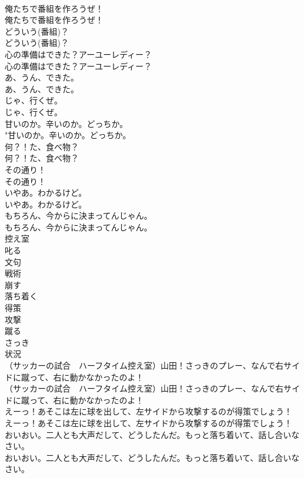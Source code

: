 \documentclass[8pt]{extreport}
\begin{document}
\begin{CJK}{UTF8}{min}
\\	俺たちで番組を作ろうぜ！	
\\	俺たちで番組を作ろうぜ！ 
\\	どういう(番組)？	
\\	どういう(番組)？ 
\\	心の準備はできた？アーユーレディー？	
\\	心の準備はできた？アーユーレディー？ 
\\	あ、うん、できた。	
\\	あ、うん、できた。 
\\	じゃ、行くぜ。	
\\	じゃ、行くぜ。 
\\	甘いのか。辛いのか。どっちか。	
\\	"甘いのか。辛いのか。どっちか。 
\\	何？！た、食べ物？	
\\	何？！た、食べ物？ 
\\	その通り！	
\\	その通り！ 
\\	いやあ。わかるけど。	
\\	いやあ。わかるけど。 
\\	もちろん、今からに決まってんじゃん。	
\\	もちろん、今からに決まってんじゃん。 
\\	控え室
\\	叱る
\\	文句
\\	戦術
\\	崩す
\\	落ち着く
\\	得策
\\	攻撃
\\	蹴る
\\	さっき
\\	状況
\\	（サッカーの試合　ハーフタイム控え室）山田！さっきのプレー、なんで右サイドに蹴って、右に動かなかったのよ！	
\\	（サッカーの試合　ハーフタイム控え室）山田！さっきのプレー、なんで右サイドに蹴って、右に動かなかったのよ！ 
\\	えーっ！あそこは左に球を出して、左サイドから攻撃するのが得策でしょう！	
\\	えーっ！あそこは左に球を出して、左サイドから攻撃するのが得策でしょう！ 
\\	おいおい。二人とも大声だして、どうしたんだ。もっと落ち着いて、話し合いなさい。	
\\	おいおい。二人とも大声だして、どうしたんだ。もっと落ち着いて、話し合いなさい。 

\end{CJK}
\end{document}

